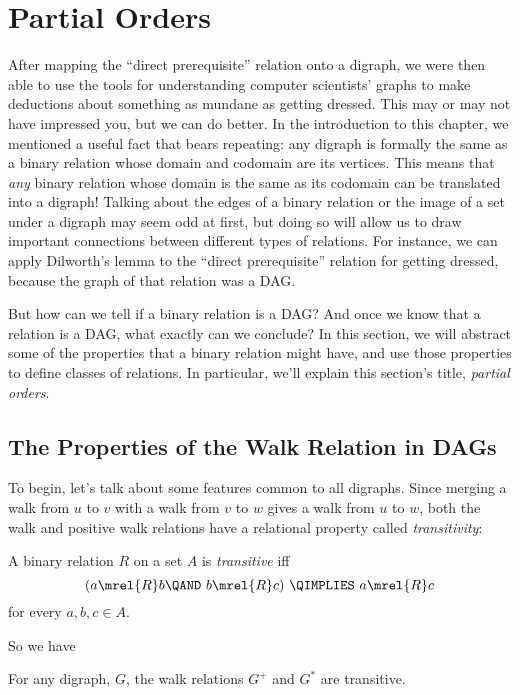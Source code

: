 \section{Partial Orders}\label{partial_order_sec}

After mapping the ``direct prerequisite'' relation onto a digraph, we
were then able to use the tools for understanding computer scientists'
graphs to make deductions about something as mundane as getting
dressed.  This may or may not have impressed you, but we can do
better.  In the introduction to this chapter, we mentioned a useful
fact that bears repeating: any digraph is formally the same as a
binary relation whose domain and codomain are its vertices.  This
means that \emph{any} binary relation whose domain is the same as its
codomain can be translated into a digraph!  Talking about the edges of
a binary relation or the image of a set under a digraph may seem odd
at first, but doing so will allow us to draw important connections
between different types of relations.  For instance, we can apply
Dilworth's lemma to the ``direct prerequisite'' relation for getting
dressed, because the graph of that relation was a DAG.

But how can we tell if a binary relation is a DAG?  And once we know
that a relation is a DAG, what exactly can we conclude?  In this
section, we will abstract some of the properties that a binary
relation might have, and use those properties to define classes of
relations.  In particular, we'll explain this section's title,
\emph{partial orders}.

\subsection{The Properties of the Walk Relation in DAGs}

To begin, let's talk about some features common to all digraphs.
Since merging a walk from $u$ to $v$ with a walk from $v$ to $w$ gives
a walk from $u$ to $w$, both the walk and positive walk%
relations have a relational property%
called \emph{transitivity}:

\begin{definition}
A binary relation $R$ on a set $A$ is
\emph{transitive}%
 iff
\[
(a \mrel{R}  b \QAND\ b \mrel{R}  c)\ \QIMPLIES\  a \mrel{R}  c
\]
\quad for every $a,b,c\in A$.
\end{definition}
So we have
\begin{lemma}
For any digraph, $G$, the walk relations $G^+$ and $G^*$ are transitive.
\end{lemma}

